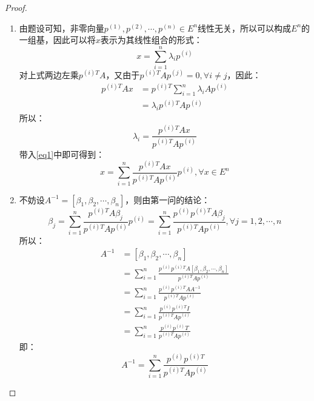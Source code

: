 \documentclass[a4paper]{article}
\begin{document}
\begin{proof}
	\begin{enumerate}[(1)]
		\item 由题设可知，非零向量$p^{(1)},p^{(2)},\cdots,p^{(n)}\in E^n$线性无关，所以可以构成$E^n$的一组基，因此可以将$x$表示为其线性组合的形式：
		\begin{equation}
		\label{eq1}
		x=\sum_{i=1}^{n}\lambda_ip^{(i)}
		\end{equation}
		对上式两边左乘$p^{(i)T}A$，又由于$p^{(i)T}Ap^{(j)}=0,\forall i\ne j$，因此：
		\begin{equation}
		\begin{aligned}
		p^{(i)T}Ax&=p^{(i)T}\sum_{i=1}^{n}\lambda_iAp^{(i)}\\
		&=\lambda_ip^{(i)T}Ap^{(i)}
		\end{aligned}
		\end{equation}
		所以：
		\begin{equation}
		\lambda_i=\frac{p^{(i)T}Ax}{p^{(i)T}Ap^{(i)}}
		\end{equation}
		带入\ref{eq1}中即可得到：
		\begin{equation}
		x=\sum_{i=1}^{n}\frac{p^{(i)T}Ax}{p^{(i)T}Ap^{(i)}}p^{(i)},\forall x\in E^n
		\end{equation}
		
		\item 不妨设$A^{-1}=[\beta_1,\beta_2,\cdots,\beta_n]$，则由第一问的结论：
		\begin{equation}
		\beta_j=\sum_{i=1}^{n}\frac{p^{(i)T}A\beta_j}{p^{(i)T}Ap^{(i)}}p^{(i)}=\sum_{i=1}^{n}\frac{p^{(i)}p^{(i)T}A\beta_j}{p^{(i)T}Ap^{(i)}},\forall j=1,2,\cdots,n
		\end{equation}
		所以：
		\begin{equation}
		\begin{aligned}
		A^{-1}&=[\beta_1,\beta_2,\cdots,\beta_n] \\
		&=\sum_{i=1}^{n}\frac{p^{(i)}p^{(i)T}A[\beta_1,\beta_2,\cdots,\beta_n]}{p^{(i)T}Ap^{(i)}} \\
		&=\sum_{i=1}^{n}\frac{p^{(i)}p^{(i)T}AA^{-1}}{p^{(i)T}Ap^{(i)}} \\
		&=\sum_{i=1}^{n}\frac{p^{(i)}p^{(i)T}I}{p^{(i)T}Ap^{(i)}} \\
		&=\sum_{i=1}^{n}\frac{p^{(i)}p^{(i)}T}{p^{(i)T}Ap^{(i)}} 
		\end{aligned}
		\end{equation}
		即：
		\begin{equation}
		A^{-1}=\sum_{i=1}^{n}\frac{p^{(i)}p^{(i)T}}{p^{(i)T}Ap^{(i)}}
		\end{equation}
	\end{enumerate}
\end{proof}
\end{document}
